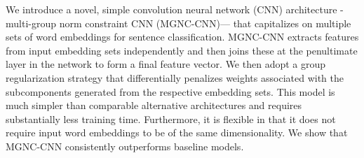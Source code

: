 We introduce a novel, simple convolution neural network (CNN) architecture - multi-group norm  constraint  CNN  (MGNC-CNN)---  that capitalizes  on multiple  sets of  word embeddings for sentence classification. MGNC-CNN extracts features from input embedding sets independently and then joins these at the penultimate layer in the network to form a final  feature vector.  We  then  adopt  a  group regularization  strategy  that differentially penalizes  weights associated with  the subcomponents generated from the respective embedding  sets.  This model  is  much simpler than comparable  alternative  architectures  and  requires substantially less training time. Furthermore, it is flexible in that it does not require input word embeddings to be of the same dimensionality.   We show  that  MGNC-CNN consistently outperforms baseline models.
